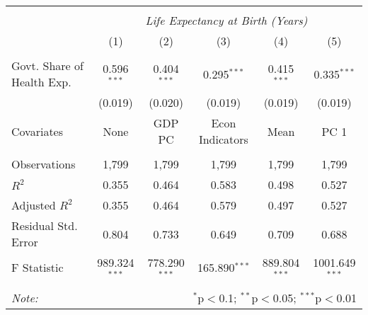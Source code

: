 \begin{table}[!htbp] \centering
\begin{tabular}{@{\extracolsep{5pt}}lccccc}
\\[-1.8ex]\hline
\hline \\[-1.8ex]
& \multicolumn{5}{c}{\textit{Life Expectancy at Birth (Years)}} \
\cr \
\\[-1.8ex] & (1) & (2) & (3) & (4) & (5) \\
\hline \\[-1.8ex]
 Govt. Share of Health Exp. & 0.596$^{***}$ & 0.404$^{***}$ & 0.295$^{***}$ & 0.415$^{***}$ & 0.335$^{***}$ \\
  & (0.019) & (0.020) & (0.019) & (0.019) & (0.019) \\
 Covariates & None & GDP PC & Econ Indicators & Mean & PC 1 \\
\hline \\[-1.8ex]
 Observations & 1,799 & 1,799 & 1,799 & 1,799 & 1,799 \\
 $R^2$ & 0.355 & 0.464 & 0.583 & 0.498 & 0.527 \\
 Adjusted $R^2$ & 0.355 & 0.464 & 0.579 & 0.497 & 0.527 \\
 Residual Std. Error & 0.804 & 0.733 & 0.649 & 0.709 & 0.688  \\
 F Statistic & 989.324$^{***}$  & 778.290$^{***}$  & 165.890$^{***}$  & 889.804$^{***}$  & 1001.649$^{***}$  \\
\hline
\hline \\[-1.8ex]
\textit{Note:} & \multicolumn{5}{r}{$^{*}$p$<$0.1; $^{**}$p$<$0.05; $^{***}$p$<$0.01} \\
\end{tabular}
\end{table}